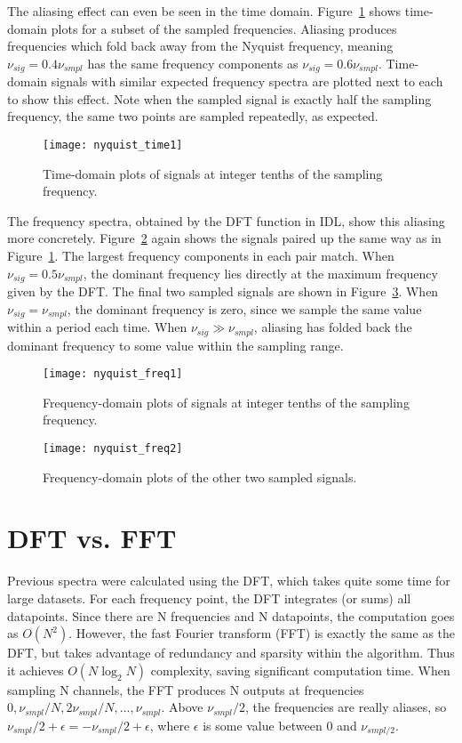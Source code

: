 \documentclass[12pt]{article}
\begin{document}
The aliasing effect can even be seen in the time domain.
Figure~\ref{fig:nyquist_time1} shows time-domain plots for a subset of the sampled frequencies.
Aliasing produces frequencies which fold back away from the Nyquist frequency, meaning $\nu_{sig}=0.4\nu_{smpl}$ has the same frequency components as $\nu_{sig}=0.6\nu_{smpl}$.
Time-domain signals with similar expected frequency spectra are plotted next to each to show this effect.
Note when the sampled signal is exactly half the sampling frequency, the same two points are sampled repeatedly, as expected.

\begin{figure}
\centering
\texttt{[image: nyquist\_time1]}
\caption{Time-domain plots of signals at integer tenths of the sampling frequency.}
\label{fig:nyquist_time1}
\end{figure}

The frequency spectra, obtained by the DFT function in IDL, show this aliasing more concretely.
Figure~\ref{fig:nyquist_freq1} again shows the signals paired up the same way as in Figure~\ref{fig:nyquist_time1}.
The largest frequency components in each pair match.
When $\nu_{sig}=0.5\nu_{smpl}$, the dominant frequency lies directly at the maximum frequency given by the DFT.
The final two sampled signals are shown in Figure~\ref{fig:nyquist_freq2}.
When $\nu_{sig}=\nu_{smpl}$, the dominant frequency is zero, since we sample the same value within a period each time.
When $\nu_{sig}\gg\nu_{smpl}$, aliasing has folded back the dominant frequency to some value within the sampling range.


\begin{figure}
\centering
\texttt{[image: nyquist\_freq1]}
\caption{Frequency-domain plots of signals at integer tenths of the sampling frequency.}
\label{fig:nyquist_freq1}
\end{figure}

\begin{figure}
\centering
\texttt{[image: nyquist\_freq2]}
\caption{Frequency-domain plots of the other two sampled signals.}
\label{fig:nyquist_freq2}
\end{figure}

\section{DFT vs. FFT}

Previous spectra were calculated using the DFT, which takes quite some time for large datasets.
For each frequency point, the DFT integrates (or sums) all datapoints.
Since there are N frequencies and N datapoints, the computation goes as $O(N^2)$.
However, the fast Fourier transform (FFT) is exactly the same as the DFT, but takes advantage of redundancy and sparsity within the algorithm.
Thus it achieves $O(N\log_2 N)$ complexity, saving significant computation time.
When sampling N channels, the FFT produces N outputs at frequencies $0, \nu_{smpl}/N, 2\nu_{smpl}/N, ..., \nu_{smpl}$.
Above $\nu_{smpl}/2$, the frequencies are really aliases, so $\nu_{smpl}/2+\epsilon=-\nu_{smpl}/2+\epsilon$, where $\epsilon$ is some value between 0 and $\nu_{smpl/2}$.
\end{document}
